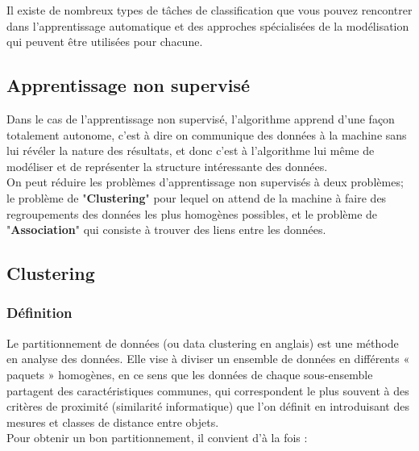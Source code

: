 \documentclass[a4paper,12pt]{report}
\begin{document}
Il existe de nombreux types de tâches de classification que vous pouvez rencontrer dans l'apprentissage automatique et des approches spécialisées de la modélisation qui peuvent être utilisées pour chacune.



\subsection{Apprentissage non supervisé} 
Dans le cas de l'apprentissage non supervisé, l'algorithme apprend d'une façon totalement autonome, c'est à dire on communique des données à la machine sans lui révéler la nature des résultats, et donc c'est à l'algorithme lui même de modéliser et de représenter la structure intéressante des données. \\
On peut réduire les problèmes d'apprentissage non supervisés à deux problèmes; le problème de "\textbf{Clustering}" pour lequel on attend de la machine à faire des regroupements des données les plus homogènes possibles, et le problème de "\textbf{Association}" qui consiste à trouver des liens entre les données. 




 













\subsection*{Clustering}
\subsubsection{Définition }
Le partitionnement de données (ou data clustering en anglais) est une méthode en analyse des données. Elle vise à diviser un ensemble de données en différents « paquets » homogènes, en ce sens que les données de chaque sous-ensemble partagent des caractéristiques communes, qui correspondent le plus souvent à des critères de proximité (similarité informatique) que l'on définit en introduisant des mesures et classes de distance entre objets.\\Pour obtenir un bon partitionnement, il convient d'à la fois :\\
\end{document}

